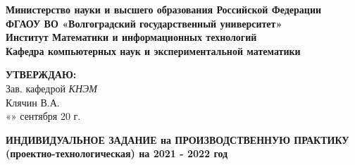 \documentclass[12pt,a4paper]{scrartcl}
\begin{document}
	\phantom{fake text for spacing}
	\begin{center}
		\textbf{Министерство науки и высшего образования Российской Федерации} \\
		\textbf{ФГАОУ ВО «Волгоградский государственный университет»} \\
		\textbf{Институт Математики и информационных технологий} \\
		\textbf{Кафедра компьютерных наук и экспериментальной математики} \\
		
		\vspace{0.6cm}
		
		\hfill\begin{minipage}{0.4\textwidth}
		\begin{flushright}
			\textbf{\textsc{УТВЕРЖДАЮ:}} \\
			Зав. кафедрой \textit{КНЭМ} \\
			Клячин В.А.\\
			«\underline{\hspace{0.5cm}}» сентября 20\underline{\hspace{0.7cm}} г.
		\end{flushright}
		\end{minipage}
		
		\vspace{0.6cm}
		
		\textbf{
			ИНДИВИДУАЛЬНОЕ ЗАДАНИЕ на ПРОИЗВОДСТВЕННУЮ ПРАКТИКУ (проектно-технологическая)
			на 2021 - 2022 год
			\vspace{0.2cm}
		}
		
		\vspace{0.3cm}
		\renewcommand{\arraystretch}{1.5} %
		

\end{center}
\end{document}
